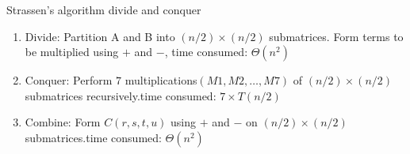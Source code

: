 \documentclass{article}
\begin{document}

Strassen's algorithm divide and conquer
\begin{enumerate}
	\item Divide: Partition A and B into $(n/2) \times (n/2)$ submatrices. Form terms to be multiplied using $+$ and $-$, time consumed: $\Theta(n^2)$
	\item Conquer: Perform $7$ multiplications$(M1,M2, \ldots, M7)$ of $(n/2)×(n/2)$ submatrices recursively.time consumed: $7 \times T(n/2)$
	\item Combine: Form $C(r, s, t, u)$ using $+$ and $-$ on $(n/2)×(n/2)$ submatrices.time consumed: $\Theta(n^2)$
\end{enumerate}
\end{document}
